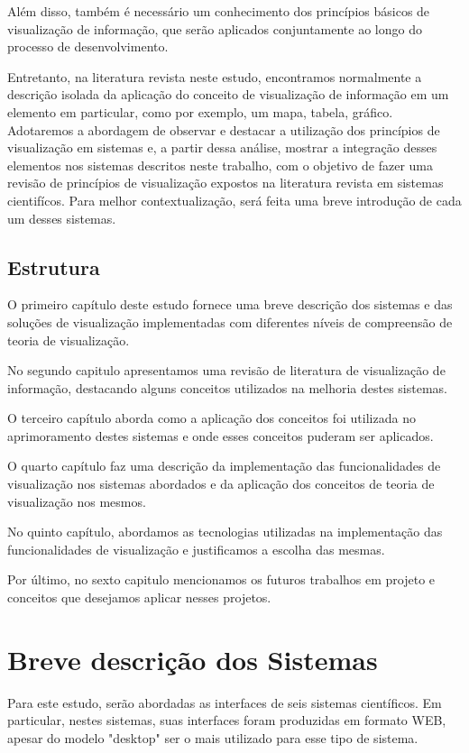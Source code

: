 \documentclass[]{article}
\begin{document}
Além disso, também é necessário um conhecimento dos princípios básicos de visualização de informação, que serão aplicados conjuntamente ao longo do processo de desenvolvimento.

Entretanto, na literatura revista neste estudo, encontramos normalmente a descrição isolada da aplicação do conceito de visualização de informação em um elemento em particular, como por exemplo, um mapa, tabela, gráfico. Adotaremos a abordagem de  observar e destacar a utilização dos princípios de visualização em sistemas e, a partir dessa análise, mostrar a integração desses elementos nos sistemas descritos neste trabalho, com o objetivo de fazer uma revisão de princípios de visualização expostos na literatura revista em sistemas cientifícos. Para melhor contextualização, será feita uma breve introdução de cada um desses sistemas.

\subsection{Estrutura}

O primeiro capítulo deste estudo fornece uma breve descrição dos sistemas e das soluções de visualização implementadas com diferentes níveis de compreensão de teoria de visualização.

No segundo capitulo apresentamos uma revisão de literatura de visualização de informação, destacando alguns conceitos utilizados na melhoria destes sistemas.

O terceiro capítulo aborda como a aplicação dos conceitos foi utilizada no aprimoramento destes sistemas e onde esses conceitos puderam ser aplicados.

O quarto capítulo faz uma descrição da implementação das funcionalidades de visualização nos sistemas abordados e da aplicação dos conceitos de teoria de visualização nos mesmos.

No quinto capítulo, abordamos as tecnologias utilizadas na implementação das funcionalidades de visualização e justificamos a escolha das mesmas.

Por último, no sexto capitulo mencionamos os futuros trabalhos em projeto e conceitos que desejamos aplicar nesses projetos.


\section{Breve descrição dos Sistemas}

Para este estudo, serão abordadas as interfaces de seis sistemas científicos. Em particular, nestes sistemas, suas interfaces foram produzidas em formato WEB, apesar do modelo "desktop" ser o mais utilizado para esse tipo de sistema.
\end{document}
